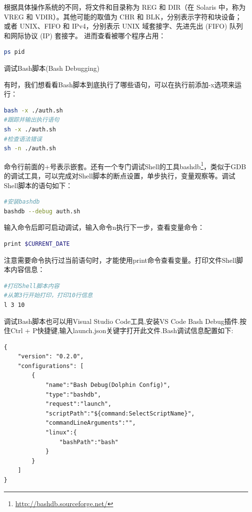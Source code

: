 \documentclass[12pt]{book}
\makeatletter
\numberwithin{dummy}{section}
\theoremstyle{ocrenumbox}
\theoremstyle{blacknumex}
\theoremstyle{blacknumbox}
\theoremstyle{ocrenum}
\renewcommand{\subsection}{\@startsection {subsection}{2}{\z@}
	{-3ex \@plus -0.1ex \@minus -.4ex}
	{0.5ex \@plus.2ex }
	{\normalfont\sffamily\bfseries}}
\makeatother
\begin{document}
根据具体操作系统的不同，将文件和目录称为 REG 和 DIR（在 Solaris 中，称为 VREG 和 VDIR）。其他可能的取值为 CHR 和 BLK，分别表示字符和块设备；或者 UNIX、FIFO 和 IPv4，分别表示 UNIX 域套接字、先进先出 (FIFO) 队列和网际协议 (IP) 套接字。
进而查看被哪个程序占用：

\begin{lstlisting}[language=Bash]
ps pid
\end{lstlisting}

\subsection{调试Bash脚本(Bash Debugging)}

有时，我们想看看Bash脚本到底执行了哪些语句，可以在执行前添加-x选项来运行：

\begin{lstlisting}[language=Bash]
bash -x ./auth.sh
#跟踪并输出执行语句
sh -x ./auth.sh
#检查语法错误
sh -n ./auth.sh
\end{lstlisting}

命令行前面的+号表示嵌套。还有一个专门调试Shell的工具bashdb\footnote{\url{http://bashdb.sourceforge.net/}}，类似于GDB的调试工具，可以完成对Shell脚本的断点设置，单步执行，变量观察等。调试Shell脚本的语句如下：

\begin{lstlisting}[language=Bash]
#安装bashdb
bashdb --debug auth.sh
\end{lstlisting}

输入命令后即可启动调试，输入命令n执行下一步，查看变量命令：

\begin{lstlisting}[language=Bash]
print $CURRENT_DATE
\end{lstlisting}

注意需要命令执行过当前语句时，才能使用print命令查看变量。打印文件Shell脚本内容信息：

\begin{lstlisting}[language=Bash]
#打印Shell脚本内容
#从第3行开始打印，打印10行信息
l 3 10 
\end{lstlisting}

调试Bash脚本也可以用Visual Studio Code工具,安装VS Code Bash Debug插件.按住Ctrl + P快捷键,输入launch.json关键字打开此文件.Bash调试信息配置如下:

\begin{lstlisting}
{
	"version": "0.2.0",
	"configurations": [
		{
			"name":"Bash Debug(Dolphin Config)",
			"type":"bashdb",
			"request":"launch",
			"scriptPath":"${command:SelectScriptName}",
			"commandLineArguments":"",
			"linux":{
				"bashPath":"bash"
			}
		}
	]
}
\end{lstlisting}
\end{document}
